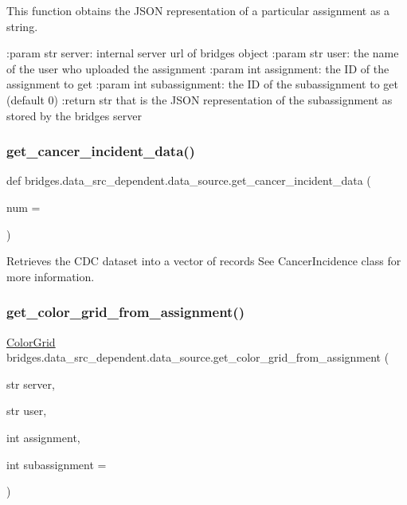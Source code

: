 This function obtains the J\+S\+ON representation of a particular assignment as a string. 

\+:param str server\+: internal server url of bridges object \+:param str user\+: the name of the user who uploaded the assignment \+:param int assignment\+: the ID of the assignment to get \+:param int subassignment\+: the ID of the subassignment to get (default 0) \+:return str that is the J\+S\+ON representation of the subassignment as stored by the bridges server \mbox{\label{namespacebridges_1_1data__src__dependent_1_1data__source_ac711dee7446daedd503ce0f091a5f85e}} 
\subsubsection{\texorpdfstring{get\_cancer\_incident\_data()}{get\_cancer\_incident\_data()}}
{\footnotesize\ttfamily def bridges.\+data\+\_\+src\+\_\+dependent.\+data\+\_\+source.\+get\+\_\+cancer\+\_\+incident\+\_\+data (\begin{DoxyParamCaption}\item[{}]{num = {} }\end{DoxyParamCaption})}



Retrieves the C\+DC dataset into a vector of records See Cancer\+Incidence class for more information. 

\mbox{\label{namespacebridges_1_1data__src__dependent_1_1data__source_a57f25e815efe350687cc774010ad0083}} 
\subsubsection{\texorpdfstring{get\_color\_grid\_from\_assignment()}{get\_color\_grid\_from\_assignment()}}
{\footnotesize\ttfamily  \mbox{\hyperlink{classbridges_1_1color__grid_1_1_color_grid}{Color\+Grid}} bridges.\+data\+\_\+src\+\_\+dependent.\+data\+\_\+source.\+get\+\_\+color\+\_\+grid\+\_\+from\+\_\+assignment (\begin{DoxyParamCaption}\item[{str}]{server,  }\item[{str}]{user,  }\item[{int}]{assignment,  }\item[{int }]{subassignment = {} }\end{DoxyParamCaption})}



